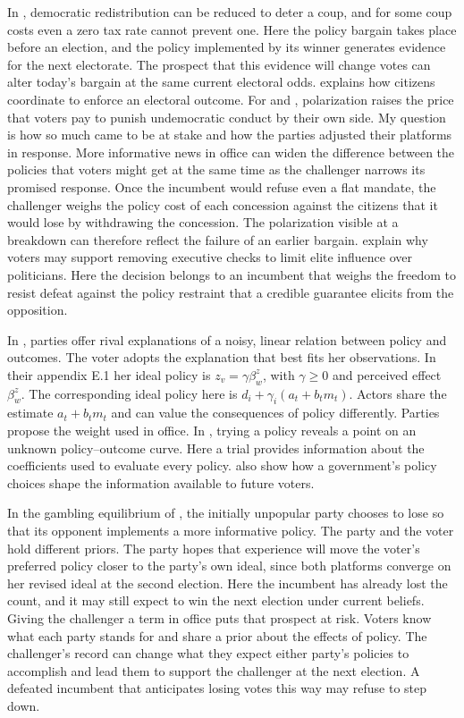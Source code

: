 \documentclass[11pt,letterpaper]{article}
\begin{document}
In \citet{acemoglurobinson2001}, democratic redistribution can be reduced to deter a coup, and for some coup costs even a zero tax rate cannot prevent one. Here the policy bargain takes place before an election, and the policy implemented by its winner generates evidence for the next electorate. The prospect that this evidence will change votes can alter today's bargain at the same current electoral odds. \citet{fearon} explains how citizens coordinate to enforce an electoral outcome. For \citet{svolik2020} and \citet{graham}, polarization raises the price that voters pay to punish undemocratic conduct by their own side. My question is how so much came to be at stake and how the parties adjusted their platforms in response. More informative news in office can widen the difference between the policies that voters might get at the same time as the challenger narrows its promised response. Once the incumbent would refuse even a flat mandate, the challenger weighs the policy cost of each concession against the citizens that it would lose by withdrawing the concession. The polarization visible at a breakdown can therefore reflect the failure of an earlier bargain. \citet*{acemoglurobinsontorvik} explain why voters may support removing executive checks to limit elite influence over politicians. Here the decision belongs to an incumbent that weighs the freedom to resist defeat against the policy restraint that a credible guarantee elicits from the opposition.

In \citet*{izzo}, parties offer rival explanations of a noisy, linear relation between policy and outcomes. The voter adopts the explanation that best fits her observations. In their appendix E.1 her ideal policy is $z_v=\gamma\beta_w^z$, with $\gamma\ge0$ and perceived effect $\beta_w^z$. The corresponding ideal policy here is $d_i+\gamma_i(a_t+b_t m_t)$. Actors share the estimate $a_t+b_t m_t$ and can value the consequences of policy differently. Parties propose the weight used in office. In \citet{callgood,calltrial}, trying a policy reveals a point on an unknown policy--outcome curve. Here a trial provides information about the coefficients used to evaluate every policy. \citet{partisantraps} also show how a government's policy choices shape the information available to future voters.

In the gambling equilibrium of \citet{izzofuture}, the initially unpopular party chooses to lose so that its opponent implements a more informative policy. The party and the voter hold different priors. The party hopes that experience will move the voter's preferred policy closer to the party's own ideal, since both platforms converge on her revised ideal at the second election. Here the incumbent has already lost the count, and it may still expect to win the next election under current beliefs. Giving the challenger a term in office puts that prospect at risk. Voters know what each party stands for and share a prior about the effects of policy. The challenger's record can change what they expect either party's policies to accomplish and lead them to support the challenger at the next election. A defeated incumbent that anticipates losing votes this way may refuse to step down.
\end{document}
